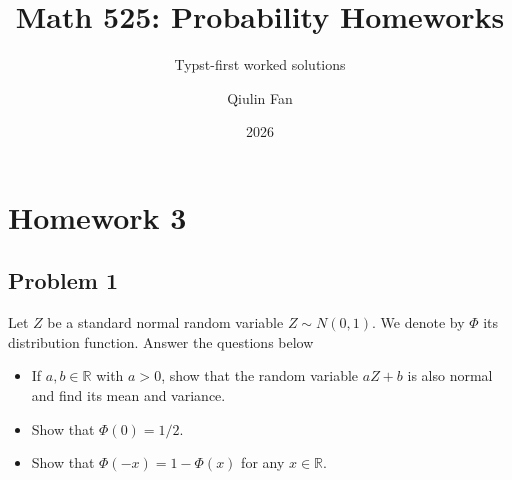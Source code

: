 \documentclass{qlnotes-export}
\title{Math 525: Probability Homeworks}
\subtitle{Typst-first worked solutions}
\author{Qiulin Fan}
\date{2026}
\begin{document}
\mainmatter
\chapter{Homework 3}\label{homework-3}

\section{Problem 1}\label{problem-1-3}

Let \(Z\) be a standard normal random variable \(Z \sim N(0,1)\). We denote by \(\Phi\) its distribution function. Answer the questions below

\begin{itemize}
\item
  If \(a,b \in {\mathbb{R}}\) with \(a > 0\), show that the random variable \(aZ + b\) is also normal and find its mean and variance.
\item
  Show that \(\Phi(0) = 1/2\).
\item
  Show that \(\Phi( - x) = 1 - \Phi(x)\) for any \(x \in {\mathbb{R}}\).
\end{itemize}
\end{document}
